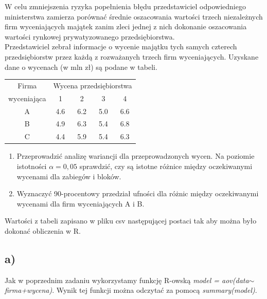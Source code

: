 \documentclass{article}
\begin{document}
W celu zmniejszenia ryzyka popełnienia błędu przedstawiciel odpowiedniego ministerstwa zamierza porównać średnie oszacowania wartości trzech niezależnych firm wyceniających majątek zanim zleci jednej z nich dokonanie oszacowania wartości rynkowej prywatyzowanego przedsiębiorstwa. \\

Przedstawiciel zebrał informacje o wycenie majątku tych samych czterech przedsiębiorstw przez każdą z rozważanych trzech firm wyceniających. Uzyskane dane o wycenach (w mln zł) są podane w tabeli.

\begin{center} \begin{tabular}{|c|c|c|c|c|} \hline
Firma & \multicolumn{4}{|c|}{Wycena przedsiębiorstwa} \\ 
wyceniająca & 1 & 2 & 3 & 4 \\ \hline
A & 4.6 & 6.2 & 5.0 & 6.6 \\
B & 4.9 & 6.3 & 5.4 & 6.8 \\ 
C & 4.4 & 5.9 & 5.4 & 6.3 \\ \hline
\end{tabular} \end{center}

\begin{enumerate}[label = \alph*)]
\item Przeprowadzić analizę wariancji dla przeprowadzonych wycen. Na poziomie istotności $\alpha=0,05$ sprawdzić, czy są istotne różnice między oczekiwanymi wycenami dla zabiegów i bloków. 
\item Wyznaczyć 90-procentowy przedział ufności dla różnic między oczekiwanymi wycenami dla firm wyceniających A i B.
\end{enumerate}

Wartości z tabeli zapisano w pliku csv następującej postaci tak aby można było dokonać obliczenia w R.
\begin{center}
\end{center}

\subsection{a)}
Jak w poprzednim zadaniu wykorzystamy funkcję R-owską \textit{model = aov(data$\sim$firma+wycena)}. Wynik tej funkcji można odczytać za pomocą \textit{summary(model)}.
\end{document}
